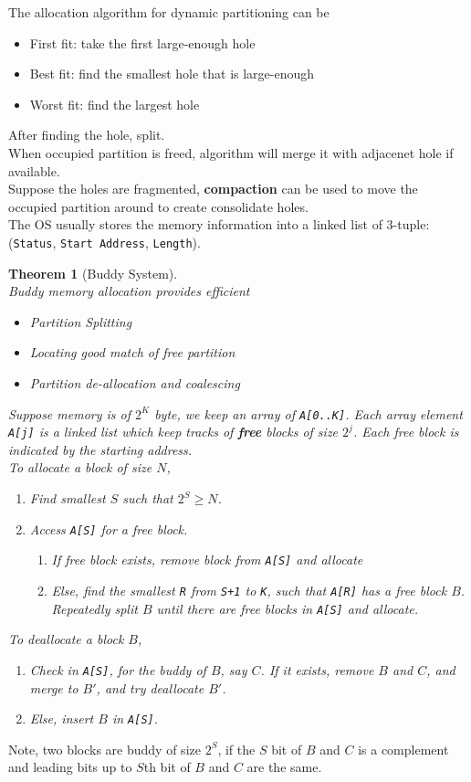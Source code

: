 \documentclass[12pt]{article}
\newtheorem{theorem}{Theorem}[section]
\theoremstyle{definition}
\begin{document}
The allocation algorithm for dynamic partitioning can be
\begin{itemize}
  \item First fit: take the first large-enough hole
  \item Best fit: find the smallest hole that is large-enough
  \item Worst fit: find the largest hole
  \end{itemize}
After finding the hole, split.\\
When occupied partition is freed, algorithm will merge it with adjacenet hole if available.\\
Suppose the holes are fragmented, \textbf{compaction} can be used to move the occupied partition around to create consolidate holes.\\
The OS usually stores the memory information into a linked list of 3-tuple: (\texttt{Status}, \texttt{Start Address}, \texttt{Length}).
\begin{theorem}[Buddy System]
\hfill\\\normalfont Buddy memory allocation provides efficient
\begin{itemize}
  \item Partition Splitting
  \item Locating good match of free partition
  \item Partition de-allocation and coalescing
\end{itemize}
Suppose memory is of $2^K$ byte, we keep an array of \texttt{A[0..K]}. Each array element \texttt{A[j]} is a linked list which keep tracks of \textbf{free} blocks of size $2^j$. Each free block is indicated by the starting address.\\
To allocate a block of size $N$, 
\begin{enumerate}
  \item Find smallest $S$ such that $2^S\geq N$.
  \item Access \texttt{A[S]} for a free block.
  \begin{enumerate}
    \item If free block exists, remove block from \texttt{A[S]} and allocate
    \item Else, find the smallest \texttt{R} from \texttt{S+1} to \texttt{K}, such that \texttt{A[R]} has a free block $B$. Repeatedly split $B$ until there are free blocks in \texttt{A[S]} and allocate.
  \end{enumerate}
\end{enumerate}
To deallocate a block $B$, 
\begin{enumerate}
  \item Check in \texttt{A[S]}, for the buddy of $B$, say $C$. If it exists, remove $B$ and $C$, and merge to $B'$, and try deallocate $B'$.
  \item Else, insert $B$ in \texttt{A[S]}.
\end{enumerate}
\end{theorem}
Note, two blocks are buddy of size $2^S$, if the $S$ bit of $B$ and $C$ is a complement and leading bits up to $S$th bit of $B$ and $C$ are the same.
\end{document}
